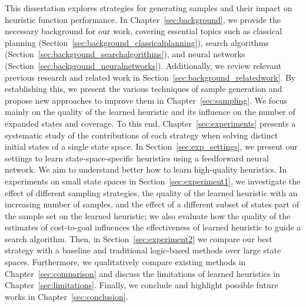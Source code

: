 This dissertation explores strategies for generating samples and their impact on heuristic function performance. In Chapter~\ref{sec:background}, we provide the necessary background for our work, covering essential topics such as classical planning (Section~\ref{sec:background_classicalplanning}), search algorithms (Section~\ref{sec:background_searchalgorithms}), and neural networks (Section~\ref{sec:background_neuralnetworks}). Additionally, we review relevant previous research and related work in Section~\ref{sec:background_relatedwork}. By establishing this, we present the various techniques of sample generation and propose new approaches to improve them in Chapter~\ref{sec:sampling}. We focus mainly on the quality of the learned heuristic and its influence on the number of expanded states and coverage. To this end, Chapter~\ref{sec:experiments} presents a systematic study of the contributions of each strategy when solving distinct initial states of a single state space. In Section~\ref{sec:exp_settings}, we present our settings to learn state-space-specific heuristics using a feedforward neural network. We aim to understand better how to learn high-quality heuristics. In experiments on small state spaces in Section~\ref{sec:experiment1}, we investigate the effect of different sampling strategies, the quality of the learned heuristic with an increasing number of samples, and the effect of a different subset of states part of the sample set on the learned heuristic; we also evaluate how the quality of the estimates of cost-to-goal influences the effectiveness of learned heuristic to guide a search algorithm. Then, in Section~\ref{sec:experiment2} we compare our best strategy with a baseline and traditional logic-based methods over large state spaces. Furthermore, we qualitatively compare existing methods in Chapter~\ref{sec:comparison} and discuss the limitations of learned heuristics in Chapter~\ref{sec:limitations}. Finally, we conclude and highlight possible future works in Chapter~\ref{sec:conclusion}.

